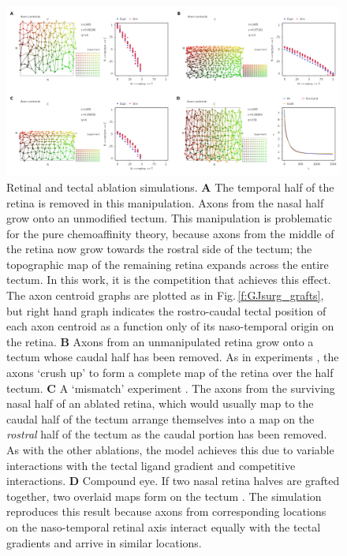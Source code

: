 \documentclass[9pt,lineno,draft]{elife}
\begin{document}
\begin{figure}
\begin{fullwidth}
\includegraphics[width=0.95\linewidth]{./images/fig_GJ_surgical_ablations.png}
\caption{Retinal and tectal ablation simulations. \textbf{A} The temporal half of the retina is removed in this manipulation. Axons from the nasal half grow onto an unmodified tectum. This manipulation is problematic for the pure chemoaffinity theory, because axons from the middle of the retina now grow towards the rostral side of the tectum; the topographic map of the remaining retina expands across the entire tectum. In this work, it is the competition that achieves this effect. The axon centroid graphs are plotted as in Fig.\,\ref{f:GJsurg_grafts}, but right hand graph indicates the rostro-caudal tectal position of each axon centroid as a function only of its naso-temporal origin on the retina. \textbf{B} Axons from an unmanipulated retina grow onto a tectum whose caudal half has been removed. As in experiments \citep{yoon_reorganization_1971,finlay_orderly_1979}, the axons `crush up' to form a complete map of the retina over the half tectum. \textbf{C} A `mismatch' experiment \citep{horder_retention_1971}. The axons from the surviving nasal half of an ablated retina, which would usually map to the caudal half of the tectum arrange themselves into a map on the \emph{rostral} half of the tectum as the caudal portion has been removed. As with the other ablations, the model achieves this due to variable interactions with the tectal ligand gradient and competitive interactions. \textbf{D} Compound eye. If two nasal retina halves are grafted together, two overlaid maps form on the tectum \citep{gaze_retino-tectal_1963}. The simulation reproduces this result because axons from corresponding locations on the naso-temporal retinal axis interact equally with the tectal gradients and arrive in similar locations.}
\label{f:GJsurg_ablate}
\end{fullwidth}
\end{figure}
\end{document}
